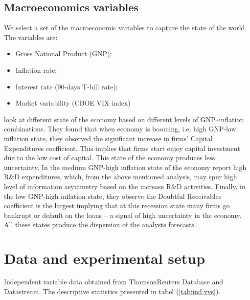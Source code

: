 \documentclass{article}\usepackage[]{graphicx}\usepackage[]{color}
\begin{document}
\subsection{Macroeconomics variables}
We select a set of the macroeconomic variables  to capture the state of the world. The variables are: 
\begin{itemize}
\item Gross National Product (GNP);
\item Inflation rate;
\item Interest rate (90-days T-bill rate);
\item Market variability (CBOE VIX index)
\end{itemize}
\cite{lev1993} look at different state of the economy based on  different levels of GNP--inflation combinations. They found that when economy is booming, i.e. high GNP-low inflation state, they observed the significant increase in firms' Capital Expenditures coefficient. This implies that firms start enjoy capital investment due to the low cost of capital. This state of the economy produces less uncertainty. In the medium GNP-high inflation state of the economy  \cite{lev1993} report high R\&D expenditures, which, from the above mentioned analysis, may spur high level of information asymmetry based on the increase R\&D activities. Finally, in the low GNP-high inflation state, they observe the Doubtful Receivables coefficient is the largest implying that at this recession state many firms go bankrupt or default on the loans -- a signal of high uncertainty in the economy. All these states produce the dispersion of the analysts forecasts.

\section{Data and experimental setup}
\label{sec:data}
Independent variable data obtained from ThomsonReuters Database and Datastream. The descriptive statistics presented in tabel (\ref{tab:ind.vvs}). 
\end{document}
